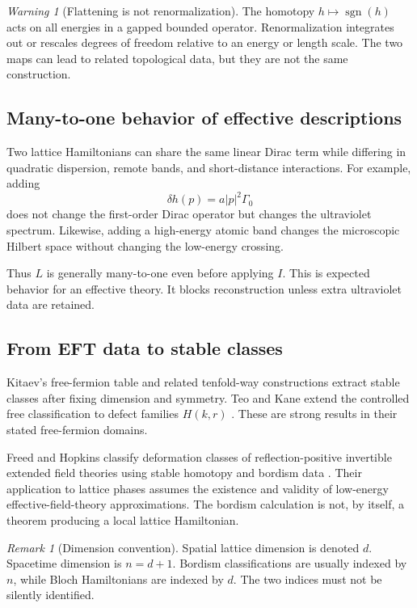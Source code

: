 \documentclass[12pt]{article}
\theoremstyle{definition}
\theoremstyle{remark}
\newtheorem{remark}[theorem]{Remark}
\newtheorem{warning}[theorem]{Warning}
\newcommand{\sgn}{\operatorname{sgn}}
\begin{document}
\begin{warning}[Flattening is not renormalization]
The homotopy $h\mapsto\sgn(h)$ acts on all energies in a gapped bounded
operator.
Renormalization integrates out or rescales degrees of freedom relative to an
energy or length scale.
The two maps can lead to related topological data, but they are not the same
construction.
\end{warning}

\subsection{Many-to-one behavior of effective descriptions}

Two lattice Hamiltonians can share the same linear Dirac term while differing
in quadratic dispersion, remote bands, and short-distance interactions.
For example, adding
\[
\delta h(p)=a|p|^2\Gamma_0
\]
does not change the first-order Dirac operator but changes the ultraviolet
spectrum.
Likewise, adding a high-energy atomic band changes the microscopic Hilbert
space without changing the low-energy crossing.

Thus $L$ is generally many-to-one even before applying $I$.
This is expected behavior for an effective theory.
It blocks reconstruction unless extra ultraviolet data are retained.

\subsection{From EFT data to stable classes}

Kitaev's free-fermion table \cite{Kitaev2009} and related tenfold-way
constructions \cite{Schnyder2008,Ryu2010} extract stable classes after fixing
dimension and symmetry.
Teo and Kane extend the controlled free classification to defect families
$H(k,r)$ \cite{TeoKane2010}.
These are strong results in their stated free-fermion domains.

Freed and Hopkins classify deformation classes of reflection-positive
invertible extended field theories using stable homotopy and bordism data
\cite{FreedHopkins2021}.
Their application to lattice phases assumes the existence and validity of
low-energy effective-field-theory approximations.
The bordism calculation is not, by itself, a theorem producing a local
lattice Hamiltonian.

\begin{remark}[Dimension convention]
Spatial lattice dimension is denoted $d$.
Spacetime dimension is $n=d+1$.
Bordism classifications are usually indexed by $n$, while Bloch Hamiltonians
are indexed by $d$.
The two indices must not be silently identified.
\end{remark}
\end{document}
